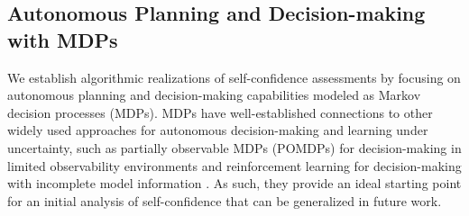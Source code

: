 \subsection{Autonomous Planning and Decision-making with MDPs} \label{sec:mdp}
We establish algorithmic realizations of self-confidence assessments by focusing on autonomous planning and decision-making capabilities modeled as Markov decision processes (MDPs). %
MDPs have well-established connections to other widely used approaches for autonomous decision-making and learning under uncertainty, such as partially observable MDPs (POMDPs) for decision-making in limited observability environments and reinforcement learning for decision-making with incomplete model information \cite{Kochenderfer2015-uu}. As such, they provide an ideal starting point for an initial analysis of self-confidence that can be generalized in future work. 

